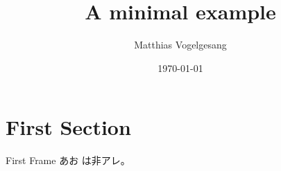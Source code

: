\documentclass[dvipdfmx,uplatex]{beamer}
\title{A minimal example}
\date{\today}
\author{Matthias Vogelgesang}
\institute{Centre for Modern Beamer Themes}
\begin{document}
  \maketitle
  \section{First Section}
  \begin{frame}{First Frame}
    あお
\mgfamily %
は非アレ。

  \end{frame}
\end{document}
